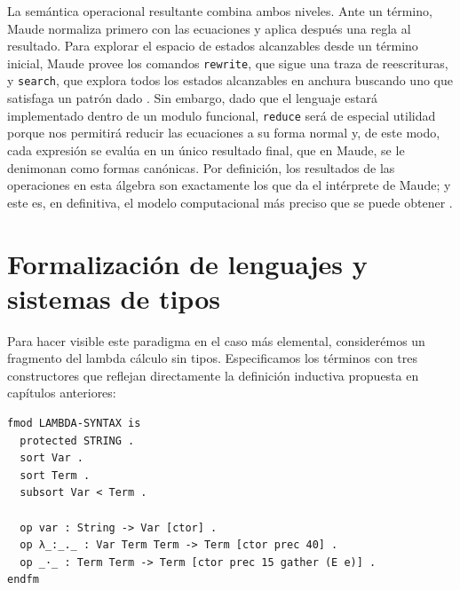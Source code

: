 La semántica operacional resultante combina ambos niveles. Ante un término, Maude normaliza primero con las ecuaciones y aplica después una regla al resultado. Para explorar el espacio de estados alcanzables desde un término inicial, Maude provee los comandos \texttt{rewrite}, que sigue una traza de reescrituras, y \texttt{search}, que explora todos los estados alcanzables en anchura buscando uno que satisfaga un patrón dado \citep{duran2019}. Sin embargo, dado que el lenguaje estará implementado dentro de un modulo funcional, \texttt{reduce} será de especial utilidad porque nos permitirá reducir las ecuaciones a su forma normal y, de este modo, cada expresión se evalúa en un único resultado final, que en Maude, se le denimonan como formas canónicas. Por definición, los resultados de las operaciones en esta álgebra son exactamente los que da el intérprete de Maude; y este es, en definitiva, el modelo computacional más preciso que se puede obtener \citep{clavel2007}.

\section{Formalización de lenguajes y sistemas de tipos}
Para hacer visible este paradigma en el caso más elemental, considerémos un fragmento del lambda cálculo sin tipos. Especificamos los términos con tres constructores que reflejan directamente la definición inductiva propuesta en capítulos anteriores:

\begin{lstlisting}
fmod LAMBDA-SYNTAX is
  protected STRING .
  sort Var .
  sort Term .
  subsort Var < Term .

  op var : String -> Var [ctor] .
  op λ_:_._ : Var Term Term -> Term [ctor prec 40] .
  op _·_ : Term Term -> Term [ctor prec 15 gather (E e)] .
endfm
\end{lstlisting}

